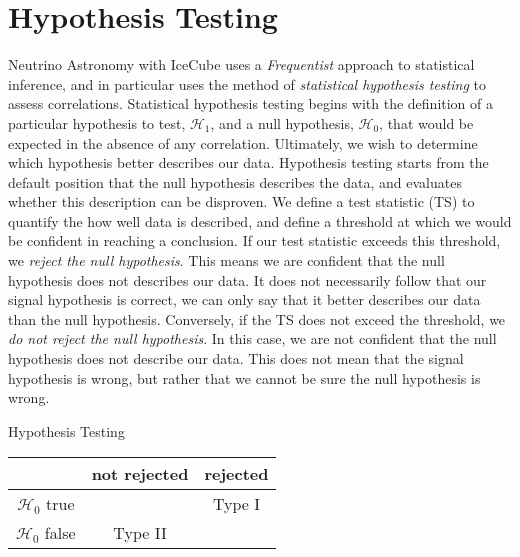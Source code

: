 \section{Hypothesis Testing}
Neutrino Astronomy with IceCube uses a \emph{Frequentist} approach to statistical inference, and in particular uses the method of \emph{statistical hypothesis testing} to assess correlations. Statistical hypothesis testing begins with the definition of a particular hypothesis to test, $\mathcal{H_{1}}$, and a null hypothesis, $\mathcal{H_{0}}$, that would be expected in the absence of any correlation. Ultimately, we wish to determine which hypothesis better describes our data. Hypothesis testing starts from the default position that the null hypothesis describes the data, and evaluates whether this description can be disproven. We define a test statistic (TS) to quantify the how well data is described, and define a threshold at which we would be confident in reaching a conclusion. If our test statistic exceeds this threshold, we \emph{reject the null hypothesis}. This means we are confident that the null hypothesis does not describes our data. It does not necessarily follow that our signal hypothesis is correct, we can only say that it better describes our data than the null hypothesis. Conversely, if the TS does not exceed the threshold,  we \emph{do not reject the null hypothesis}. In this case, we are not confident that the null hypothesis does not describe our data. This does not mean that the signal hypothesis is wrong, but rather that we cannot be sure the null hypothesis is wrong. 

\begin{margintable}
	\caption[]{Hypothesis Testing}
	\raggedright
	\begin{tabular}{ c|  c c}
		\hline
		& not rejected & rejected \\
		\hline
		$\mathcal{H_{0}}$ true & \checkmark & Type I \\
		$\mathcal{H_{0}}$ false &Type II & \checkmark\\
		\hline
	\end{tabular}
	\label{tab:hypothesis}
\end{margintable}

